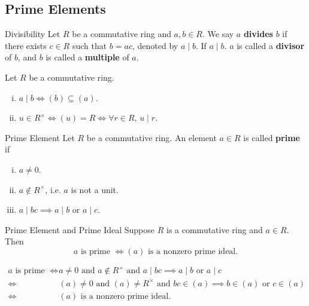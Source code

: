 \subsection{Prime Elements}
\begin{definition}{Divisibility}{}
    Let $R$ be a commutative ring and $a,b\in R$. We say $a$ \textbf{divides} $b$ if there exists $c\in R$ such that $b=ac$, denoted by $a\mid b$. If $a\mid b$. $a$ is called a \textbf{divisor} of $b$, and $b$ is called a \textbf{multiple} of $a$.
\end{definition}


\begin{proposition}{}{}
    Let $R$ be a commutative ring.
    \begin{enumerate}[(i)]
        \item $a \mid b\iff(b) \subseteq (a)$.
        \item $u\in R^\times \iff (u) = R  \iff \forall r\in R,\,u\mid r$.
    \end{enumerate}
\end{proposition}

\begin{definition}{Prime Element}{}
    Let $R$ be a commutative ring. An element $a\in R$ is called \textbf{prime} if
    \begin{enumerate}[(i)]
        \item $a\ne 0$.
        \item $a\notin R^\times$, i.e. $a$ is not a unit.
        \item $a\mid bc\implies a\mid b\text{ or }a\mid c$.
    \end{enumerate}
\end{definition}



\begin{proposition}{Prime Element and Prime Ideal}{}
    Suppose $R$ is a commutative ring and $a\in R$. Then
    \[
        a\text{ is prime }\iff (a)\text{ is a nonzero prime ideal}.
    \]
\end{proposition}

\begin{prf}
    \begin{align*}
        a\text{ is prime }\iff &a\ne 0\text{ and }a\notin R^\times\text{ and }a\mid bc\implies a\mid b\text{ or }a\mid c\\
        \iff &(a)\ne 0\text{ and }(a)\ne R^\times\text{ and }bc\in (a)\implies b\in (a)\text{ or }c\in (a)\\
        \iff &(a)\text{ is a nonzero prime ideal}.
    \end{align*}
\end{prf}

